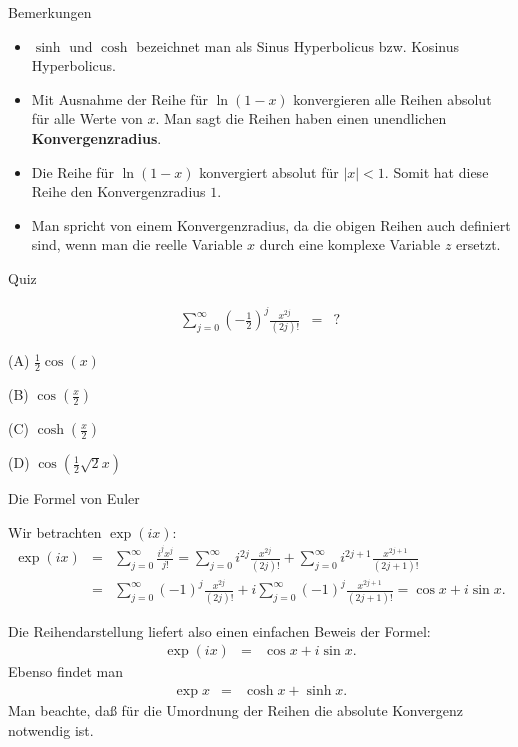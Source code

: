 \documentclass[german]{beamer}
\newcommand{\bq}{\begin{eqnarray*}}
\newcommand{\eq}{\end{eqnarray*}}
\begin{document}
\begin{frame}{Bemerkungen}

\begin{itemize}

\item $\sinh$ und $\cosh$ bezeichnet man als Sinus Hyperbolicus bzw. Kosinus Hyperbolicus.

\item Mit Ausnahme der Reihe f\"ur $\ln(1-x)$ konvergieren alle Reihen absolut f\"ur alle Werte von $x$.
Man sagt die Reihen haben einen unendlichen {\bf Konvergenzradius}.

\item Die Reihe f\"ur $\ln(1-x)$ konvergiert absolut f\"ur $|x|<1$. Somit hat diese Reihe den Konvergenzradius
$1$.

\item Man spricht von einem Konvergenzradius, da die obigen Reihen auch definiert sind, wenn man die reelle
Variable $x$ durch eine komplexe Variable $z$ ersetzt.

\end{itemize}

\end{frame}

\begin{frame}{Quiz}

\bq
 \sum\limits_{j=0}^\infty \left(-\frac{1}{2}\right)^{j} \frac{x^{2j}}{(2j)!} & = & ?
\eq
\begin{description}
\item{(A)} $\frac{1}{2}\cos\left(x\right)$
\item{(B)} $\cos\left(\frac{x}{2}\right)$
\item{(C)} $\cosh\left(\frac{x}{2}\right)$
\item{(D)} $\cos\left(\frac{1}{2}\sqrt{2} x\right)$
\end{description}

\end{frame}

\begin{frame}{Die Formel von Euler}

Wir betrachten $\exp(i x)$:
{\footnotesize
\bq
 \exp\left(i x\right) & = & \sum\limits_{j=0}^\infty \frac{i^j x^j}{j!}
 = 
 \sum\limits_{j=0}^\infty i^{2j} \frac{x^{2j}}{(2j)!}
 + \sum\limits_{j=0}^\infty i^{2j+1} \frac{x^{2j+1}}{(2j+1)!}
 \nonumber \\
 & = & 
 \sum\limits_{j=0}^\infty (-1)^{j} \frac{x^{2j}}{(2j)!}
 + i \sum\limits_{j=0}^\infty (-1)^{j} \frac{x^{2j+1}}{(2j+1)!}
 = \cos x + i \sin x.
\eq
}

Die Reihendarstellung liefert also einen einfachen Beweis der Formel:
\bq
 \exp(i x) & = & \cos x + i \sin x.
\eq
Ebenso findet man
\bq
 \exp x & = & \cosh x + \sinh x.
\eq
Man beachte, da{\ss} f\"ur die Umordnung der Reihen die absolute Konvergenz notwendig ist.

\end{frame}
\end{document}

